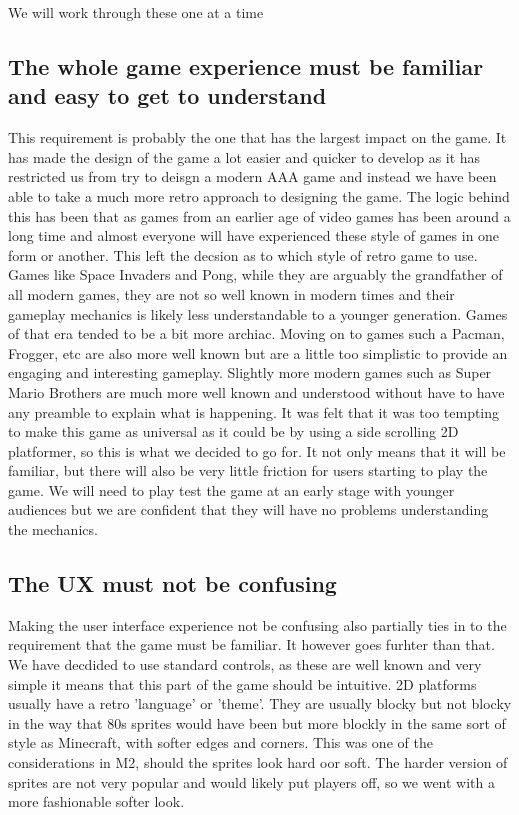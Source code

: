 \documentclass{article}
\begin{document}
We will work through these one at a time

\subsection{ The whole game experience must be familiar and easy to get to understand }
This requirement is probably the one that has the largest impact on the game. It has made the design of the game a lot easier and quicker to develop as it has restricted us from try to deisgn a modern AAA game and instead we have been able to take a much more retro approach to designing the game. The logic behind this has been that as games from an earlier age of video games has been around a long time and almost everyone will have experienced these style of games in one form or another. 
This left the decsion as to which style of retro game to use. Games like Space Invaders and Pong, while they are arguably the grandfather of all modern games, they are not so well known in modern times and their gameplay mechanics is likely less understandable to a younger generation. Games of that era tended to be a bit more archiac. 
Moving on to games such a Pacman, Frogger, etc are also more well known but are a little too simplistic to provide an engaging and interesting gameplay.
Slightly more modern games such as Super Mario Brothers are much more well known and understood without have to have any preamble to explain what is happening. It was felt that it was too tempting to make this game as universal as it could be by using a side scrolling 2D platformer, so this is what we decided to go for. It not only means that it will be familiar, but there will also be very little friction for users starting to play the game. We will need to play test the game at an early stage with younger audiences but we are confident that they will have no problems understanding the mechanics.
 
\subsection{ The UX must not be confusing }
Making the user interface experience not be confusing also partially ties in to the requirement that the game must be familiar. It however goes furhter than that. We have decdided to use standard controls, as these are well known and very simple it means that this part of the game should be intuitive.
2D platforms usually have a retro 'language' or 'theme'. They are usually blocky but not blocky in the way that 80s sprites would have been but more blockly in the same sort of style as Minecraft, with softer edges and corners. This was one of the considerations in M2, should the sprites look hard oor soft. The harder version of sprites are not very popular and would likely put players off, so we went with a more fashionable softer look.
\end{document}
